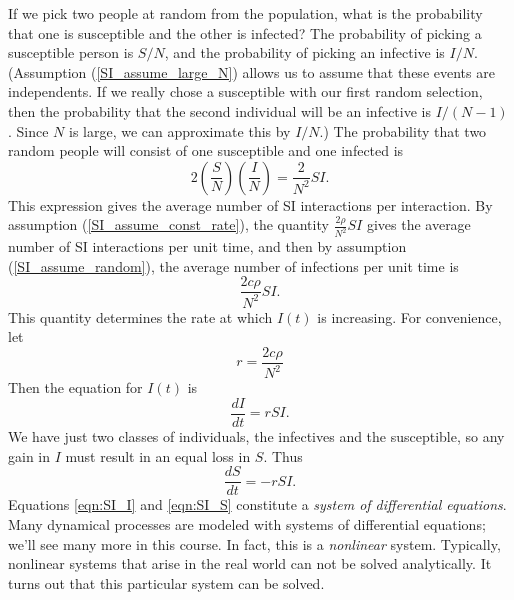 If we pick two people at random from
the population, what is the probability that one is
susceptible and the other is infected? The probability
of picking a susceptible person is $S/N$, and the probability
of picking an infective is $I/N$.
(Assumption (\ref{SI_assume_large_N}) allows us to assume
that these events are independents.
If we really chose a susceptible with our first random
selection, then the probability that the second individual
will be an infective is $I/(N-1)$.  Since $N$ is large,
we can approximate this by $I/N$.)
The probability that two random
people will consist of one susceptible and one infected
is
\begin{equation}
    2\left(\frac{S}{N}\right)\left(\frac{I}{N}\right) = \frac{2}{N^2}SI.
\end{equation}
This expression gives
the average number of SI interactions per
interaction.
By assumption (\ref{SI_assume_const_rate}),
the quantity $\frac{2\rho}{N^2}SI$
gives the average number of SI interactions per unit time,
and then by assumption (\ref{SI_assume_random}),
the average number of infections per unit time is
\begin{equation}
   \frac{2c\rho}{N^2}SI.
\end{equation}
This quantity determines the rate at which $I(t)$
is increasing.
For convenience, let
\begin{equation}
   r = \frac{2c\rho}{N^2}
\end{equation}
Then the equation for $I(t)$ is
\begin{equation}
  \frac{dI}{dt} = r S I.
\label{eqn:SI_I}
\end{equation}
We have just two classes of individuals,
the infectives and the susceptible,
so any gain in $I$ must result in an equal
loss in $S$.  Thus
\begin{equation}
  \frac{dS}{dt} = -r S I.
\label{eqn:SI_S}
\end{equation}
Equations \eqref{eqn:SI_I} and \eqref{eqn:SI_S}
constitute a \emph{system of differential equations}.
Many dynamical processes are modeled with systems of differential
equations; we'll see many more in this course.
In fact, this is a \emph{nonlinear} system.
Typically, nonlinear systems
that arise in the real world can not be solved analytically.
It turns out that this particular system can be solved.


